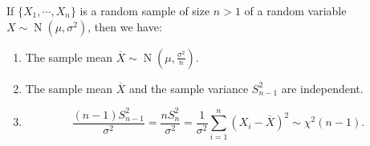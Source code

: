 \documentclass{huhtakm-template-book-v2}
\DeclareMathOperator{\N}{N}
\begin{document}
    \begin{thm}
        \label{Chapter 1 (Theorem) Normal and chi-squared distribution related to sample mean and variance}
        If $\{X_{1}, \cdots, X_{n}\}$ is a random sample of size $n > 1$ of a random variable $X \sim \N(\mu, \sigma^{2})$, then we have:
        \begin{enumerate}
            \item The sample mean $\overline{X} \sim \N\left(\mu, \frac{\sigma^{2}}{n}\right)$.
            \item The sample mean $\overline{X}$ and the sample variance $S_{n-1}^{2}$ are independent.
            \item 
            \begin{equation*}
                \frac{(n - 1) S_{n-1}^{2}}{\sigma^{2}} = \frac{n S_{n}^{2}}{\sigma^{2}} = \frac{1}{\sigma^{2}} \sum_{i=1}^{n} (X_{i} - \overline{X})^{2} \sim \chi^{2}(n - 1).
            \end{equation*}
        \end{enumerate}
    \end{thm}
\end{document}
